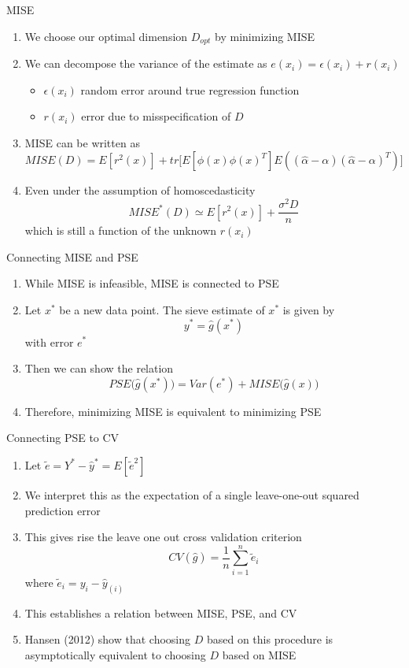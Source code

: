 \documentclass{beamer}
\begin{document}
\begin{frame}{MISE}%
\begin{enumerate}
\item We choose our optimal dimension $D_{opt}$ by minimizing MISE 
\item We can decompose the variance of the estimate as $e(x_i) = \epsilon(x_i) + r(x_i)$
\begin{itemize}
  \item $\epsilon(x_i)$ random error around true regression function
  \item $r(x_i)$ error due to misspecification of $D$ 
\end{itemize}\pause
\item MISE can be written as $$MISE(D) = E[r^{2}(x)] + tr\Big[E[\phi(x)\phi(x)^{T}]E\left((\hat{\alpha} - \alpha)(\hat{\alpha} - \alpha)^{T}\right)\Big]$$
\item Even under the assumption of homoscedasticity $$MISE^*(D)\simeq E[r^2(x)] + \frac{\sigma^2 D}{n}$$
which is still a function of the unknown $r(x_i)$
\end{enumerate}
\end{frame}

\begin{frame}{Connecting MISE and PSE}%
\begin{enumerate}
\item While MISE is infeasible, MISE is connected to PSE 
\item Let $x^{*}$ be a new data point. The sieve estimate of $x^{*}$ is given by $$y^{*} = \hat{g}(x^{*})$$ with error $e^{*}$
\item Then we can show the relation $$PSE\Big(\hat{g}(x^{*})\Big) = Var(e^{*}) + MISE\Big(\hat{g}(x)\Big)$$
\item Therefore, minimizing MISE is equivalent to minimizing PSE
\end{enumerate}
\end{frame}
\begin{frame}{Connecting PSE to CV}%
\begin{enumerate}
\item Let $\tilde{e} = Y^{*} - \hat{y}^{*} = E[\tilde{e}^2]$
\item We interpret this as the expectation of a single leave-one-out squared prediction error
\item This gives rise the leave one out cross validation criterion $$CV(\hat{g}) = \frac{1}{n}\sum_{i=1}^n\tilde{e}_{i}$$ where $\tilde{e}_i = y_i - \hat{y}_{(i)}$
\item This establishes a relation between MISE, PSE, and CV \pause 
\item Hansen (2012) show that choosing $D$ based on this procedure is asymptotically equivalent to choosing $D$ based on MISE
\end{enumerate}
\end{frame}
\end{document}
